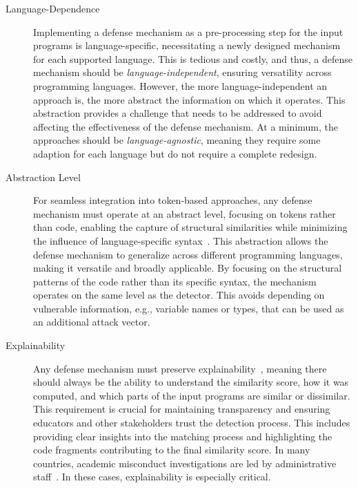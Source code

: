 \begin{description}
    \item[Language-Dependence] Implementing a defense mechanism as a pre-processing step for the input programs is language-specific, necessitating a newly designed mechanism for each supported language. This is tedious and costly, and thus, a defense mechanism should be \textit{language-independent}, ensuring versatility across programming languages. However, the more language-independent an approach is, the more abstract the information on which it operates. This abstraction provides a challenge that needs to be addressed to avoid affecting the effectiveness of the defense mechanism. At a minimum, the approaches should be \textit{language-agnostic}, meaning they require some adaption for each language but do not require a complete redesign.
    
    \item[Abstraction Level] For seamless integration into token-based approaches, any defense mechanism must operate at an abstract level, focusing on tokens rather than code, enabling the capture of structural similarities while minimizing the influence of language-specific syntax~\cite{prechelt2002, liu2006, Nichols2019}. 
    This abstraction allows the defense mechanism to generalize across different programming languages, making it versatile and broadly applicable. By focusing on the structural patterns of the code rather than its specific syntax, the mechanism operates on the same level as the detector. This avoids depending on vulnerable information, e.g., variable names or types, that can be used as an additional attack vector.

    \item[Explainability] Any defense mechanism must preserve explainability~\cite{Karnalim2021}, meaning there should always be the ability to understand the similarity score, how it was computed, and which parts of the input programs are similar or dissimilar. This requirement is crucial for maintaining transparency and ensuring educators and other stakeholders trust the detection process. This includes providing clear insights into the matching process and highlighting the code fragments contributing to the final similarity score. In many countries, academic misconduct investigations are led by administrative staff~\cite{Simon2016}. In these cases, explainability is especially critical.


\end{description}
